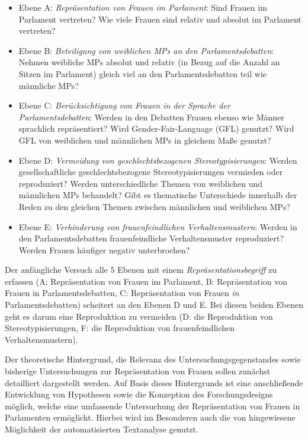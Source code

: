 \documentclass[12pt, 
    twoside=false, 
    bibliography=totoc, 
    numbers=endperiod, 
    headings=normal, 
    toc=chapterentrydotfill
    ]{scrbook}
\begin{document}
\begin{itemize}
    \item Ebene A: \emph{Repräsentation von Frauen im Parlament}: Sind Frauen im Parlament vertreten? Wie viele Frauen sind relativ und absolut im Parlament vertreten? 
    \item Ebene B: \emph{Beteiligung von weiblichen MPs an den Parlamentsdebatten}: Nehmen weibliche MPs absolut und relativ (in Bezug auf die Anzahl an Sitzen im Parlament) gleich viel an den Parlamentsdebatten teil wie männliche MPs? 
    \item Ebene C: \emph{Berücksichtigung von Frauen in der Sprache der Parlamentsdebatten}: Werden in den Debatten Frauen ebenso wie Männer sprachlich repräsentiert? Wird Gender-Fair-Language (GFL) genutzt? Wird GFL von weiblichen und männlichen MPs in gleichem Maße genutzt? 
    \item Ebene D: \emph{Vermeidung von geschlechtsbezogenen Stereotypisierungen}: Werden gesellschaftliche geschlechtsbezogene Stereotypisierungen vermieden oder reproduziert? Werden unterschiedliche Themen von weiblichen und männlichen MPs behandelt? Gibt es thematische Unterschiede innerhalb der Reden zu den gleichen Themen zwischen männlichen und weiblichen MPs? 
    \item Ebene E: \emph{Verhinderung von frauenfeindlichen Verhaltensmustern}: Werden in den Parlamentsdebatten frauenfeindliche Verhaltensmuster reproduziert? Werden Frauen häufiger negativ unterbrochen? 
    \end{itemize}

Der anfängliche Versuch alle 5 Ebenen mit einem \emph{Repräsentationsbegriff} zu erfassen (A: Repräsentation von Frauen im Parlament, B: Repräsentation von Frauen in Parlamentsdebatten, C: Repräsentation von Frauen \emph{in} Parlamentsdebatten) scheitert an den Ebenen D und E. Bei diesen beiden Ebenen geht es darum eine Reproduktion zu vermeiden (D: die Reproduktion von Stereotypisierungen, F: die Reproduktion von frauenfeindlichen Verhaltensmustern). 

Der theoretische Hintergrund, die Relevanz des Untersuchungsgegenstandes sowie bisherige Untersuchungen zur Repräsentation von Frauen sollen zunächst detailliert dargestellt werden. Auf Basis dieses Hintergrunds ist eine anschließende Entwicklung von Hypothesen sowie die Konzeption des Forschungsdesigns möglich, welche eine umfassende Untersuchung der Repräsentation von Frauen in Parlamenten ermöglicht. Hierbei wird im Besonderen auch die von \textcite[18]{back_2018} hingewiesene Möglichkeit der automatisierten Textanalyse genutzt.
\end{document}

